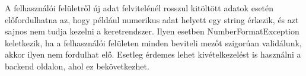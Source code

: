 
A felhasználói felületről új adat felvitelénél rosszul kitöltött adatok esetén előfordulhatna az, hogy például numerikus adat helyett egy string érkezik, és azt sajnos nem tudja kezelni a keretrendszer. Ilyen esetben NumberFormatException keletkezik, ha a felhasználói felületen minden beviteli mezőt szigorúan validálunk, akkor ilyen nem fordulhat elő. Esetleg érdemes lehet kivételkezelést is használni a backend oldalon, ahol ez bekövetkezhet. 

